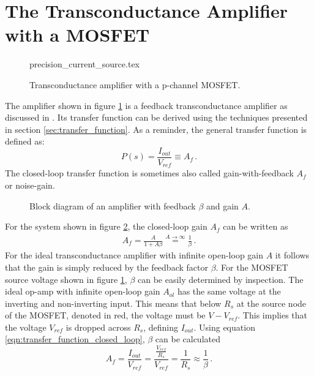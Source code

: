 \documentclass[12pt]{book}
\begin{document}
\section{The Transconductance Amplifier with a MOSFET}
\label{sec:transfer_function_transconductance}
\begin{figure}[ht]
    \centering
    {precision_current_source.tex}
    \caption{Transconductance amplifier with a p-channel MOSFET.}
    \label{fig:transconductance_amplifier}
\end{figure}
The amplifier shown in figure \ref{fig:transconductance_amplifier} is a feedback transconductance amplifier as discussed in \cite{fet_equations}. Its transfer function can be derived using the techniques presented in section \ref{sec:transfer_function}. As a reminder, the general transfer function is defined as:
\begin{equation}
    P(s) = \frac{I_{out}}{V_{ref}} \equiv A_f \, .
\end{equation}
The closed-loop transfer function is sometimes also called gain-with-feedback $A_f$ \cite{fet_equations} or noise-gain.

\begin{figure}[ht]
    \centering
    \caption{Block diagram of an amplifier with feedback $\beta$ and gain $A$.}
    \label{fig:closed_loop_gain}
\end{figure}
For the system shown in figure \ref{fig:closed_loop_gain}, the closed-loop gain $A_f$ can be written as
\begin{align}
    A_f = \frac{A}{1 + A \beta} \overset{A \to \infty}{=} \frac 1 \beta\,. \label{eqn:transfer_function_closed_loop}
\end{align}
For the ideal transconductance amplifier with infinite open-loop gain $A$ it follows that the gain is simply reduced by the feedback factor $\beta$. For the MOSFET source voltage shown in figure \ref{fig:transconductance_amplifier}, $\beta$ can be easily determined by inspection. The ideal op-amp with infinite open-loop gain $A_{ol}$ has the same voltage at the inverting and non-inverting input. This means that below $R_s$ at the source node of the MOSFET, denoted in red, the voltage must be $V-V_{ref}$. This implies that the voltage $V_{ref}$ is dropped across $R_s$, defining $I_{out}$. Using equation \ref{eqn:transfer_function_closed_loop}, $\beta$ can be calculated
\begin{equation}
    A_f = \frac{I_{out}}{V_{ref}} = \frac{\frac{V_{ref}}{R_s}}{V_{ref}} = \frac{1}{R_s} \approx \frac 1 \beta \,. \label{eqn:transconductance_amplifier_feedback_factor}
\end{equation}
\end{document}
